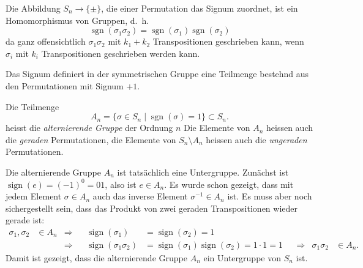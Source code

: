 Die Abbildung $S_n\to\{\pm\}$, die einer Permutation das Signum zuordnet,
ist ein Homomorphismus von Gruppen,
d.~h.
\[
\operatorname{sgn}(\sigma_1\sigma_2)
=
\operatorname{sgn}(\sigma_1)
\operatorname{sgn}(\sigma_2)
\]
da ganz offensichtlich $\sigma_1\sigma_2$ mit $k_1+k_2$ Transpositionen
geschrieben kann, wenn $\sigma_i$ mit $k_i$ Transpositionen geschrieben
werden kann.

Das Signum definiert in der symmetrischen Gruppe eine Teilmenge bestehnd
aus den Permutationen mit Signum $+1$.

\begin{definition}
Die Teilmenge
\[
A_n
=
\{
\sigma\in S_n\;|\; \operatorname{sgn}(\sigma)=1
\}
\subset S_n.
\]
heisst die {\em alternierende Gruppe} der Ordnung $n$
Die Elemente von $A_n$ heissen auch die {\em geraden} Permutationen,
die
Elemente von $S_n\setminus A_n$ heissen auch die {\em ungeraden}
Permutationen.
\end{definition}

Die alternierende Gruppe $A_n$ ist tatsächlich eine Untergruppe.
Zunächst ist $\operatorname{sign}(e)=(-1)^0=01$, also ist $e\in A_n$.
Es wurde schon gezeigt, dass mit jedem Element $\sigma\in A_n$ auch
das inverse Element $\sigma^{-1}\in A_n$ ist.
Es muss aber noch sichergestellt sein, dass das Produkt von zwei
geraden Transpositionen wieder gerade ist:
\[
\begin{aligned}
\sigma_1,\sigma_2&\in A_n
&\Rightarrow&&
\operatorname{sign}(\sigma_1)
&=
\operatorname{sign}(\sigma_2)
=
1
\\
&&\Rightarrow&&
\operatorname{sign}(\sigma_1\sigma_2)
&=
\operatorname{sign}(\sigma_1)
\operatorname{sign}(\sigma_2)
=
1\cdot 1=1
&&\Rightarrow&
\sigma_1\sigma_2&\in A_n.
\end{aligned}
\]
Damit ist gezeigt, dass die alternierende Gruppe $A_n$ ein Untergruppe von 
$S_n$ ist.

